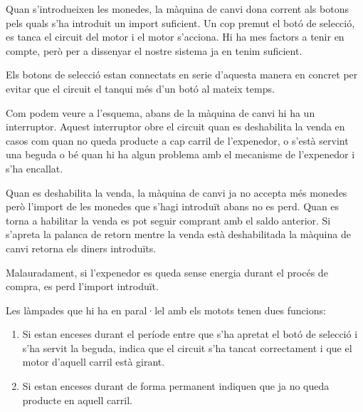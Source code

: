 Quan s'introdueixen les monedes, la màquina de canvi dona corrent als botons pels quals s'ha introduit un import suficient. Un cop premut el botó de selecció, es tanca el circuit del motor i el motor s'acciona. Hi ha mes factors a tenir en compte, però per a dissenyar el nostre sistema ja en tenim suficient.

Els botons de selecció estan connectats en serie d'aquesta manera en concret per evitar que el circuit el tanqui més d'un botó al mateix temps.

Com podem veure a l'esquema, abans de la màquina de canvi hi ha un interruptor. Aquest interruptor obre el circuit quan es deshabilita la venda en casos com quan no queda producte a cap carril de l'expenedor, o s'està servint una beguda o bé quan hi ha algun problema amb el mecanisme de l'expenedor i s'ha encallat.

Quan es deshabilita la venda, la màquina de canvi ja no accepta més monedes però l'import de les monedes que s'hagi introduït abans no es perd. Quan es torna a habilitar la venda es pot seguir comprant amb el saldo anterior. Si s'apreta la palanca de retorn  mentre la venda està deshabilitada la màquina de canvi retorna els diners introduïts.

Malauradament, si l'expenedor es queda sense energia durant el procés de compra, es perd l'import introduït.

Les làmpades que hi ha en paral·lel amb els motots tenen dues funcions:
\begin{enumerate}
\item Si estan enceses durant el període entre que s'ha apretat el botó de selecció i s'ha servit la beguda, indica que el circuit s'ha tancat correctament i que el motor d'aquell carril està girant.
\item Si estan enceses durant de forma permanent indiquen que ja no queda producte en aquell carril.
\end{enumerate}